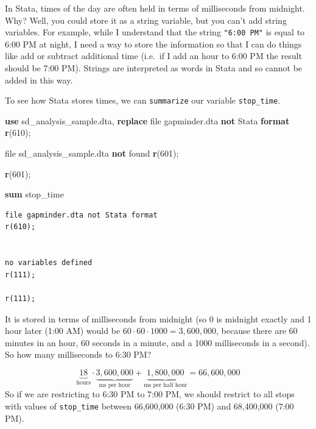 \documentclass[
]{book}
\newenvironment{Shaded}{\begin{snugshade}}{\end{snugshade}}
\newcommand{\FunctionTok}[1]{\textcolor[rgb]{0.13,0.29,0.53}{\textbf{#1}}}
\newcommand{\KeywordTok}[1]{\textcolor[rgb]{0.13,0.29,0.53}{\textbf{#1}}}
\newcommand{\NormalTok}[1]{#1}
\begin{document}
In Stata, times of the day are often held in terms of milliseconds from midnight. Why? Well, you could store it as a string variable, but you can't add string variables. For example, while I understand that the string \texttt{"6:00\ PM"} is equal to 6:00 PM at night, I need a way to store the information so that I can do things like add or subtract additional time (i.e.~if I add an hour to 6:00 PM the result should be 7:00 PM). Strings are interpreted as words in Stata and so cannot be added in this way.

To see how Stata stores times, we can \texttt{summarize} our variable \texttt{stop\_time}.

\begin{Shaded}
\begin{Highlighting}[]
  \KeywordTok{use}\NormalTok{ sd\_analysis\_sample.dta, }\KeywordTok{replace}
\NormalTok{file gapminder.dta }\KeywordTok{not}\NormalTok{ Stata }\KeywordTok{format}
\FunctionTok{r}\NormalTok{(610);}


\NormalTok{file sd\_analysis\_sample.dta }\KeywordTok{not}\NormalTok{ found}
\FunctionTok{r}\NormalTok{(601);}

\FunctionTok{r}\NormalTok{(601);}
\end{Highlighting}
\end{Shaded}

\begin{Shaded}
\begin{Highlighting}[]
  \KeywordTok{sum}\NormalTok{ stop\_time }
\end{Highlighting}
\end{Shaded}

\begin{verbatim}
file gapminder.dta not Stata format
r(610);


no variables defined
r(111);

r(111);
\end{verbatim}

It is stored in terms of milliseconds from midnight (so 0 is midnight exactly and 1 hour later (1:00 AM) would be \(60\cdot 60 \cdot 1000 = 3,600,000\), because there are 60 minutes in an hour, 60 seconds in a minute, and a 1000 milliseconds in a second). So how many milliseconds to 6:30 PM?

\[
\underbrace{18}_{\text{hours}} \cdot \underbrace{3,600,000}_{\text{ms per hour}} + \underbrace{1,800,000}_{\text{ms per half hour}}=66,600,000
\]
So if we are restricting to 6:30 PM to 7:00 PM, we should restrict to all stops with values of \texttt{stop\_time} between 66,600,000 (6:30 PM) and 68,400,000 (7:00 PM).
\end{document}
